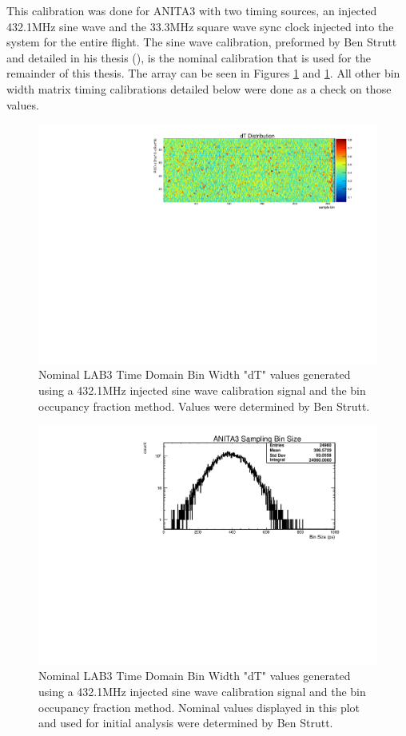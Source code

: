		This calibration was done for ANITA3 with two timing sources, an injected 432.1MHz sine wave and the 33.3MHz square wave sync clock injected into the system for the entire flight.  The sine wave calibration, preformed by Ben Strutt and detailed in his thesis (\cite{BenSThesis}), is the nominal calibration that is used for the remainder of this thesis.  The array can be seen in Figures \ref{fig:dTNominal2D} and \ref{fig:dTNominal2D}.  All other bin width matrix timing calibrations detailed below were done as a check on those values.
		
	\begin{figure}
		\includegraphics[width=\textwidth]{figures/dTNominal2D}
		\caption{Nominal LAB3 Time Domain Bin Width "dT" values generated using a 432.1MHz injected sine wave calibration signal and the bin occupancy fraction method.  Values were determined by Ben Strutt\cite{BenSThesis}.}
		\label{fig:dTNominal2D}
	\end{figure}
	
	
	\begin{figure}
		\includegraphics[width=\textwidth]{figures/dTNominal}
		\caption{Nominal LAB3 Time Domain Bin Width "dT" values generated using a 432.1MHz injected sine wave calibration signal and the bin occupancy fraction method.  Nominal values displayed in this plot and used for initial analysis were determined by Ben Strutt\cite{BenSThesis}.}
		\label{fig:dTNominal}
	\end{figure}
		
